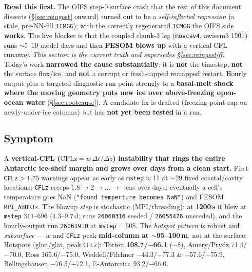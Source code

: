 \documentclass[11pt,a4paper]{article}
\newcommand{\code}[1]{\texttt{\small #1}}
\begin{document}
\textbf{Read this first.} The OIFS step-0 surface crash that the rest of this document
dissects (\S\ref{sec:reingest} onward) turned out to be a \emph{self-inflicted regression}
(a stale, pre-NN-fill \code{ICMGG}); with the correctly regenerated \code{ICMGG} the OIFS
side \textbf{works}. The live blocker is that the coupled chunk-3 leg (\code{movcav4},
awiesm3 1901) runs $\sim$5--10 model days and then \textbf{FESOM blows up} with a
vertical-CFL runaway. \emph{This section is the current truth and supersedes
\S\ref{sec:reingest}ff.} Today's work \textbf{narrowed the cause substantially}: it is
\textbf{not} the timestep, \textbf{not} the surface flux/ice, and \textbf{not} a corrupt or
fresh-capped remapped restart. Hourly output plus a targeted diagnostic run point strongly to a
\textbf{basal-melt shock where the moving geometry puts new ice over above-freezing open-ocean
water} (\S\ref{sec:rootcause}). A candidate fix is drafted (freezing-point cap on
newly-under-ice columns) but has \textbf{not yet been tested} in a run.

\subsection{Symptom}
A \textbf{vertical-CFL ($\mathrm{CFLz}=w\,\Delta t/\Delta z$) instability that rings the
entire Antarctic ice-shelf margin and grows over days from a clean start.} First
\code{CFLz}$>1.75$ warnings appear as early as \code{mstep}$\approx$11 at $\sim$29 fixed
coastal/cavity locations; \code{CFLz} creeps $1.8\to2\to\dots\to$ tens over days; eventually
a cell's temperature goes NaN (\code{"found temperture becomes NaN"}) and FESOM
\code{MPI\_ABORT}s. The blowup \emph{step} is stochastic (MPI/threading): at
\textbf{1200\,s} it blew at \code{mstep} $311$--$696$ ($4.3$--$9.7$\,d; runs \code{26060316}
seeded / \code{26055476} unseeded), and the hourly-output run \code{26061910} at
\code{mstep}$=608$. The \emph{hotspot pattern} is robust and \emph{subsurface} --- $w$ and
\code{CFLz} peak \textbf{mid-column at $\sim$95--100\,m}, not at the surface. Hotspots
(glon/glat, peak \code{CFLz}): Totten \textbf{108.7/$-$66.1} ($\sim$8), Amery/Prydz
71.4/$-$70.0, Ross 165.6/$-$75.0, Weddell/Filchner $-$44.3/$-$77.3 \& $-$57.6/$-$75.9,
Bellingshausen $-$76.5/$-$72.1, E-Antarctica 93.2/$-$66.0.
\end{document}
